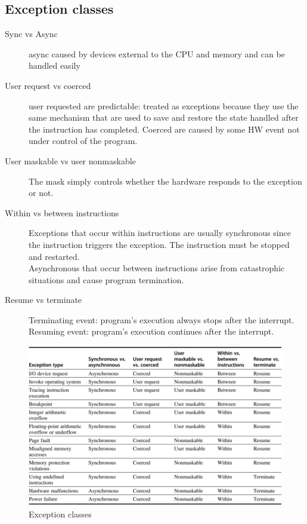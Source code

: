 \subsection{Exception classes}\label{subsec:exception-classes}
\begin{description}
    \item[Sync vs Async] async caused by devices external to the CPU and memory and can be handled easily
    \item[User request vs coerced] user requested are predictable: treated as exceptions because they use the same
    mechanism that are used to save and restore the state handled after the instruction has completed.
    Coerced are caused by some HW event not under control of the program.
    \item[User maskable vs user nonmaskable] The mask simply controls whether the hardware responds to the
    exception or not.
    \item[Within vs between instructions] Exceptions that occur within instructions are usually
    synchronous since the instruction triggers the exception.
    The instruction must be stopped and restarted.\\
    Asynchronous that occur between instructions arise from
    catastrophic situations and cause program termination.
    \item[Resume vs terminate] Terminating event: program’s execution always stops after the
    interrupt.
    Resuming event: program’s execution continues after the
    interrupt.
\end{description}

\begin{figure}[h]
    \centering
    \includegraphics[scale = 0.3]{images/classes-of-exception}
    \caption{Exception classes}
    \label{fig:exception-classes}
\end{figure}

